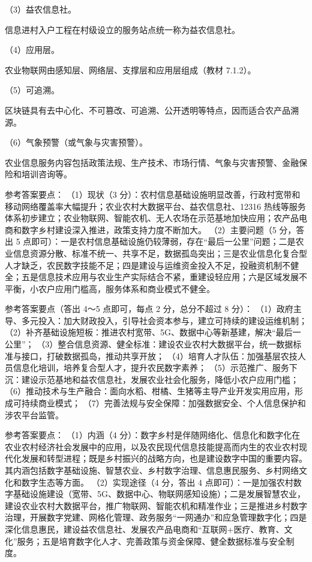 \documentclass[a4paper,11pt]{article}
\begin{document}
\q （3）益农信息社。\begin{analysis}信息进村入户工程在村级设立的服务站点统一称为益农信息社。\end{analysis}

\q （4）应用层。\begin{analysis}农业物联网由感知层、网络层、支撑层和应用层组成（教材 7.1.2）。\end{analysis}

\q （5）可追溯。\begin{analysis}区块链具有去中心化、不可篡改、可追溯、公开透明等特点，因而适合农产品溯源。\end{analysis}

\q （6）气象预警（或气象与灾害预警）。\begin{analysis}农业信息服务内容包括政策法规、生产技术、市场行情、气象与灾害预警、金融保险和培训咨询等。\end{analysis}


\q 参考答案要点：
（1）现状（3 分）：农村信息基础设施明显改善，行政村宽带和移动网络覆盖率大幅提升；农业农村大数据平台、益农信息社、12316 热线等服务体系初步建立；农业物联网、智能农机、无人农场在示范基地加快应用；农产品电商和数字乡村建设深入推进，政策支持力度不断加大。
（2）主要问题（5 分，答出 5 点即可）：一是农村信息基础设施仍较薄弱，存在“最后一公里”问题；二是农业信息资源分散、标准不统一、共享不足，数据孤岛突出；三是农业信息化复合型人才缺乏，农民数字技能不足；四是建设与运维资金投入不足，投融资机制不健全；五是信息技术应用与农业生产实际结合不紧，重建设轻应用；六是区域发展不平衡，小农户应用门槛高，服务体系和商业模式不健全。

\q 参考答案要点（答出 4～5 点即可，每点 2 分，总分不超过 8 分）：
（1）政府主导、多元投入：加大财政投入，引导社会资本参与，建立可持续的建设运维机制；
（2）补齐基础设施短板：推进农村宽带、5G、数据中心等新基建，解决“最后一公里”；
（3）整合信息资源、健全标准：建设农业农村大数据平台，统一数据标准与接口，打破数据孤岛，推动共享开放；
（4）培育人才队伍：加强基层农技人员信息化培训，培养复合型人才，提升农民数字素养；
（5）示范推广、服务下沉：建设示范基地和益农信息社，发展农业社会化服务，降低小农户应用门槛；
（6）推动技术与生产融合：面向水稻、柑橘、生猪等主导产业开发实用应用，形成可持续商业模式；
（7）完善法规与安全保障：加强数据安全、个人信息保护和涉农平台监管。

\q 参考答案要点：
（1）内涵（4 分）：数字乡村是伴随网络化、信息化和数字化在农业农村经济社会发展中的应用，以及农民现代信息技能提高而内生的农业农村现代化发展和转型进程；既是乡村振兴的战略方向，也是建设数字中国的重要内容。其内涵包括数字基础设施、智慧农业、乡村数字治理、信息惠民服务、乡村网络文化和数字生态等方面。
（2）实现途径（4 分，答出 4 点即可）：一是加强农村数字基础设施建设（宽带、5G、数据中心、物联网感知设施）；二是发展智慧农业，建设农业农村大数据平台，推广物联网、智能农机和精准作业；三是推进乡村数字治理，开展数字党建、网格化管理、政务服务“一网通办”和应急管理数字化；四是深化信息惠民，建设益农信息社、发展农产品电商和“互联网+医疗、教育、文化”服务；五是培育数字化人才、完善政策与资金保障、健全数据标准与安全制度。
\end{document}
